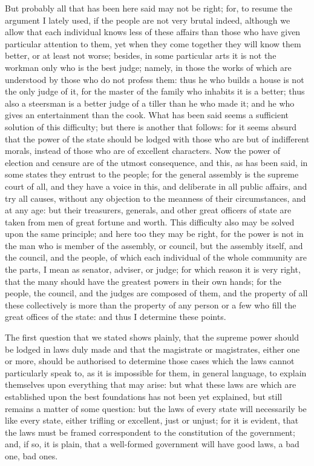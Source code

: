 But probably all that has been here said may not be right; for, to resume
the argument I lately used, if the people are not very brutal indeed,
although we allow that each individual knows less of these affairs than
those who have given particular attention to them, yet when they come
together they will know them better, or at least not worse; besides, in
some particular arts it is not the workman only who is the best judge;
namely, in those the works of which are understood by those who do not
profess them: thus he who builds a house is not the only judge of it, for
the master of the family who inhabits it is a better; thus also a
steersman is a better judge of a tiller than he who made it; and he who
gives an entertainment than the cook. What has been said seems a
sufficient solution of this difficulty; but there is another that follows:
for it seems absurd that the power of the state should be lodged with
those who are but of indifferent morals, instead of those who are of
excellent characters. Now the power of election and censure are of the
utmost consequence, and this, as has been said, in some states they
entrust to the people; for the general assembly is the supreme court of
all, and they have a voice in this, and deliberate in all public affairs,
and try all causes, without any objection to the meanness of their
circumstances, and at any age: but their treasurers, generals, and other
great officers of state are taken from men of great fortune and worth.
This difficulty also may be solved upon the same principle; and here too
they may be right, for the power is not in the man who is member of the
assembly, or council, but the assembly itself, and the council, and the
people, of which each individual of the whole community are the parts, I
mean as senator, adviser, or judge; for which reason it is very right,
that the many should have the greatest powers in their own hands; for the
people, the council, and the judges are composed of them, and the property
of all these collectively is more than the property of any person or a few
who fill the great offices of the state: and thus I determine these
points.

The first question that we stated shows plainly, that the supreme power
should be lodged in laws duly made and that the magistrate or magistrates,
either one or more, should be authorised to determine those cases which
the laws cannot particularly speak to, as it is impossible for them, in
general language, to explain themselves upon everything that may arise:
but what these laws are which are established upon the best foundations
has not been yet explained, but still remains a matter of some question:
but the laws of every state will necessarily be like every state, either
trifling or excellent, just or unjust; for it is evident, that the laws
must be framed correspondent to the constitution of the government; and,
if so, it is plain, that a well-formed government will have good laws, a
bad one, bad ones.

